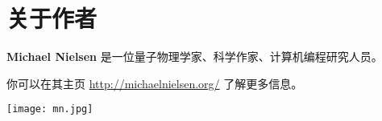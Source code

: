 
\chapter{关于作者}
\label{ch:Author}

\begin{minipage}{0.7\linewidth}
\textbf{Michael Nielsen} 是一位量子物理学家、科学作家、计算机编程研究人员。

你可以在其主页 \href{http://michaelnielsen.org/}{http://michaelnielsen.org/} 了解更多信息。
\end{minipage}
\hfill
\begin{minipage}{0.25\linewidth}
\texttt{[image: mn.jpg]}  
\end{minipage}
